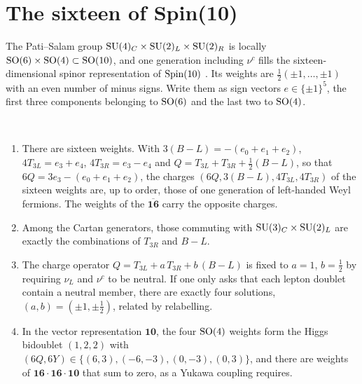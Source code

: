 \section{The sixteen of Spin(10)}

The Pati--Salam group $\mathrm{SU}(4)_C\times\mathrm{SU}(2)_L\times\mathrm{SU}(2)_R$ is locally $\mathrm{SO}(6)\times\mathrm{SO}(4)\subset\mathrm{SO}(10)$, and one generation including $\nu^c$ fills the sixteen-dimensional spinor representation of $\mathrm{Spin}(10)$ \cite{GeorgiSO10,FritzschMinkowski1975}. Its weights are $\frac12(\pm1,\dots,\pm1)$ with an even number of minus signs. Write them as sign vectors $e\in\{\pm1\}^5$, the first three components belonging to $\mathrm{SO}(6)$ and the last two to $\mathrm{SO}(4)$.

\begin{theorem}\label{thm:sixteen}\ver\
\begin{enumerate}[label=(\roman*)]
\item There are sixteen weights. With $3(B-L)=-(e_0+e_1+e_2)$, $4T_{3L}=e_3+e_4$, $4T_{3R}=e_3-e_4$ and $Q=T_{3L}+T_{3R}+\frac12(B-L)$, so that $6Q=3e_3-(e_0+e_1+e_2)$, the charges $(6Q,3(B-L),4T_{3L},4T_{3R})$ of the sixteen weights are, up to order, those of one generation of left-handed Weyl fermions. The weights of the $\overline{\mathbf{16}}$ carry the opposite charges.
\item Among the Cartan generators, those commuting with $\mathrm{SU}(3)_C\times\mathrm{SU}(2)_L$ are exactly the combinations of $T_{3R}$ and $B-L$.
\item The charge operator $Q=T_{3L}+a\,T_{3R}+b\,(B-L)$ is fixed to $a=1$, $b=\frac12$ by requiring $\nu_L$ and $\nu^c$ to be neutral. If one only asks that each lepton doublet contain a neutral member, there are exactly four solutions, $(a,b)=(\pm1,\pm\frac12)$, related by relabelling.
\item In the vector representation $\mathbf{10}$, the four $\mathrm{SO}(4)$ weights form the Higgs bidoublet $(1,2,2)$ with $(6Q,6Y)\in\{(6,3),(-6,-3),(0,-3),(0,3)\}$, and there are weights of $\mathbf{16}\cdot\mathbf{16}\cdot\mathbf{10}$ that sum to zero, as a Yukawa coupling requires.
\end{enumerate}
\end{theorem}
